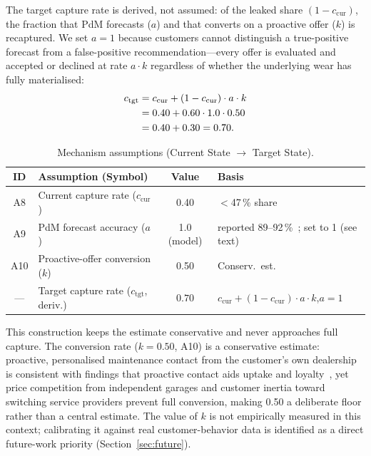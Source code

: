 \documentclass[conference,a4paper]{IEEEtran}
\newcommand{\cIst}{c_{\mathrm{cur}}}
\newcommand{\cSoll}{c_{\mathrm{tgt}}}
\begin{document}
The target capture rate is derived, not assumed: of the leaked share
$(1-\cIst)$, the fraction that PdM forecasts ($a$) and that converts on a
proactive offer ($k$) is recaptured. We set $a{=}1$ because customers cannot
distinguish a true-positive forecast from a false-positive recommendation---every
offer is evaluated and accepted or declined at rate $a \cdot k$ regardless of
whether the underlying wear has fully materialised:
\begin{align}
\cSoll &= \cIst + (1-\cIst)\cdot a \cdot k \notag \\
       &= 0.40 + 0.60 \cdot 1.0 \cdot 0.50 \notag \\
       &= 0.40 + 0.30 = 0.70 .
\end{align}
\vspace{-\intextsep}
\begin{table}[h!]
\caption{Mechanism assumptions (Current State $\rightarrow$ Target State).}
\label{tab:mech}
\centering
\small
\begin{tabularx}{\columnwidth}{@{} c >{\raggedright\arraybackslash}X c >{\raggedright\arraybackslash}p{} @{}}
\toprule
\textbf{ID} & \textbf{Assumption (Symbol)} & \textbf{Value} & \textbf{Basis} \\
\midrule
A8  & Current capture rate ($\cIst$)       & 0.40            & ${<}$47\,\% share~\cite{dat2026report} \\
A9  & PdM forecast accuracy ($a$)          & 1.0 (model)     & reported 89--92\,\%~\cite{abougrad2026xai}; set to 1 (see text) \\
A10 & Proactive-offer conversion ($k$)     & 0.50            & Conserv.\ est.~\cite{challagalla_proactive_2009,gonzalez_service_2015} \\
--- & Target capture rate ($\cSoll$, deriv.)& $0.70$         & $\cIst+(1{-}\cIst)\cdot a\cdot k$,\;$a{=}1$ \\
\bottomrule
\end{tabularx}
\end{table}

This construction keeps the estimate conservative and never approaches full capture.
The conversion rate ($k = 0.50$, A10) is a conservative estimate: proactive,
personalised maintenance contact from the customer's own dealership is consistent
with findings that proactive contact aids uptake and loyalty~\cite{challagalla_proactive_2009,gonzalez_service_2015},
yet price competition from independent garages and customer inertia toward switching service providers prevent full conversion, making 0.50 a deliberate floor rather than a central estimate. The value of $k$ is not empirically measured in this context; calibrating it against real customer-behavior data is identified as a direct future-work priority (Section~\ref{sec:future}).
\end{document}
